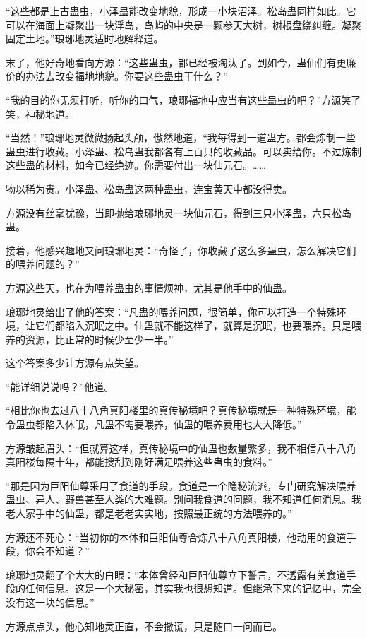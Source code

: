 \begin{this_body}
“这些都是上古蛊虫，小泽蛊能改变地貌，形成一小块沼泽。松岛蛊同样如此。它可以在海面上凝聚出一块浮岛，岛屿的中央是一颗参天大树，树根盘绕纠缠。凝聚固定土地。”琅琊地灵适时地解释道。

末了，他好奇地看向方源：“这些蛊虫，都已经被淘汰了。到如今，蛊仙们有更廉价的办法去改变福地地貌。你要这些蛊虫干什么？”

“我的目的你无须打听，听你的口气，琅琊福地中应当有这些蛊虫的吧？”方源笑了笑，神秘地道。

“当然！”琅琊地灵微微扬起头颅，傲然地道，“我每得到一道蛊方。都会炼制一些蛊虫进行收藏。小泽蛊、松岛蛊我都各有上百只的收藏品。可以卖给你。不过炼制这些蛊的材料，如今已经绝迹。你需要付出一块仙元石。……

物以稀为贵。小泽蛊、松岛蛊这两种蛊虫，连宝黄天中都没得卖。

方源没有丝毫犹豫，当即抛给琅琊地灵一块仙元石，得到三只小泽蛊，六只松岛蛊。

接着，他感兴趣地又问琅琊地灵：“奇怪了，你收藏了这么多蛊虫，怎么解决它们的喂养问题的？”

方源这些天，也在为喂养蛊虫的事情烦神，尤其是他手中的仙蛊。

琅琊地灵给出了他的答案：“凡蛊的喂养问题，很简单，你可以打造一个特殊环境，让它们都陷入沉眠之中。仙蛊就不能这样了，就算是沉眠，也要喂养。只是喂养的资源，比正常的时候少至少一半。”

这个答案多少让方源有点失望。

“能详细说说吗？”他道。

“相比你也去过八十八角真阳楼里的真传秘境吧？真传秘境就是一种特殊环境，能令蛊虫都陷入休眠，凡蛊不需要喂养，仙蛊的喂养费用也大大降低。”

方源皱起眉头：“但就算这样，真传秘境中的仙蛊也数量繁多，我不相信八十八角真阳楼每隔十年，都能搜刮到刚好满足喂养这些蛊虫的食料。”

“那是因为巨阳仙尊采用了食道的手段。食道是一个隐秘流派，专门研究解决喂养蛊虫、异人、野兽甚至人类的大难题。别问我食道的问题，我不知道任何消息。我老人家手中的仙蛊，都是老老实实地，按照最正统的方法喂养的。”

方源还不死心：“当初你的本体和巨阳仙尊合炼八十八角真阳楼，他动用的食道手段，你会不知道？”

琅琊地灵翻了个大大的白眼：“本体曾经和巨阳仙尊立下誓言，不透露有关食道手段的任何信息。这是一个大秘密，其实我也很想知道。但继承下来的记忆中，完全没有这一块的信息。”

方源点点头，他心知地灵正直，不会撒谎，只是随口一问而已。


\end{this_body}
